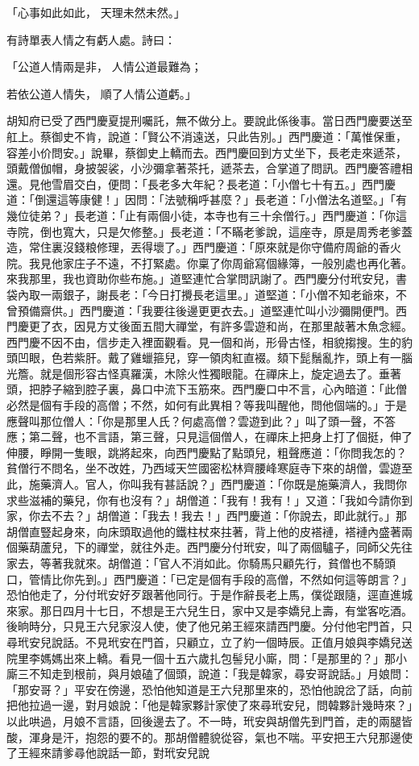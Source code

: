 「心事如此如此，  天理未然未然。」

有詩單表人情之有虧人處。詩曰：

「公道人情兩是非，  人情公道最難為；

若依公道人情失，  順了人情公道虧。」

胡知府已受了西門慶夏提刑囑託，無不做分上。要說此係後事。當日西門慶要送至舡上。蔡御史不肯，說道：「賢公不消遠送，只此告別。」西門慶道：「萬惟保重，容差小价問安。」說畢，蔡御史上轎而去。西門慶回到方丈坐下，長老走來遞茶，頭戴僧伽帽，身披袈裟，小沙彌拿著茶托，遞茶去，合掌道了問訊。西門慶答禮相還。見他雪眉交白，便問：「長老多大年紀？長老道：「小僧七十有五。」西門慶道：「倒還這等康健！」因問：「法號稱呼甚麼？」長老道：「小僧法名道堅。」「有幾位徒弟？」長老道：「止有兩個小徒，本寺也有三十余僧行。」西門慶道：「你這寺院，倒也寬大，只是欠修整。」長老道：「不瞞老爹說，這座寺，原是周秀老爹蓋造，常住裏沒錢粮修理，丟得壞了。」西門慶道：「原來就是你守備府周爺的香火院。我見他家庄子不遠，不打緊處。你稟了你周爺寫個緣簿，一般別處也再化著。來我那里，我也資助你些布施。」道堅連忙合掌問訊謝了。西門慶分付玳安兒，書袋內取一兩銀子，謝長老：「今日打攪長老這里。」道堅道：「小僧不知老爺來，不曾預備齋供。」西門慶道：「我要往後邊更更衣去。」道堅連忙叫小沙彌開便門。西門慶更了衣，因見方丈後面五間大禪堂，有許多雲遊和尚，在那里敲著木魚念經。西門慶不因不由，信步走入裡面觀看。見一個和尚，形骨古怪，相貌搊搜。生的豹頭凹眼，色若紫肝。戴了雞蠟箍兒，穿一領肉紅直裰。頦下髭鬚亂拃，頭上有一腦光簷。就是個形容古怪真羅漢，木除火性獨眼龍。在禪床上，旋定過去了。垂著頭，把脖子縮到腔子裏，鼻口中流下玉筋來。西門慶口中不言，心內暗道：「此僧必然是個有手段的高僧；不然，如何有此異相？等我叫醒他，問他個端的。」于是應聲叫那位僧人：「你是那里人氏？何處高僧？雲遊到此？」叫了頭一聲，不答應；第二聲，也不言語，第三聲，只見這個僧人，在禪床上把身上打了個挺，伸了伸腰，睜開一隻眼，跳將起來，向西門慶點了點頭兒，粗聲應道：「你問我怎的？貧僧行不問名，坐不改姓，乃西域天竺國密松林齊腰峰寒庭寺下來的胡僧，雲遊至此，施藥濟人。官人，你叫我有甚話說？」西門慶道：「你既是施藥濟人，我問你求些滋補的藥兒，你有也沒有？」胡僧道：「我有！我有！」又道：「我如今請你到家，你去不去？」胡僧道：「我去！我去！」西門慶道：「你說去，即此就行。」那胡僧直豎起身來，向床頭取過他的鐵柱杖來拄著，背上他的皮褡褳，褡褳內盛著兩個藥葫蘆兒，下的禪堂，就往外走。西門慶分付玳安，叫了兩個驢子，同師父先往家去，等著我就來。胡僧道：「官人不消如此。你騎馬只顧先行，貧僧也不騎頭口，管情比你先到。」西門慶道：「已定是個有手段的高僧，不然如何這等朗言？」恐怕他走了，分付玳安好歹跟著他同行。于是作辭長老上馬，僕從跟隨，逕直進城來家。那日四月十七日，不想是王六兒生日，家中又是李嬌兒上壽，有堂客吃酒。後晌時分，只見王六兒家沒人使，使了他兄弟王經來請西門慶。分付他宅門首，只尋玳安兒說話。不見玳安在門首，只顧立，立了約一個時辰。正值月娘與李嬌兒送院里李媽媽出來上轎。看見一個十五六歲扎包髻兒小廝，問：「是那里的？」那小廝三不知走到根前，與月娘磕了個頭，說道：「我是韓家，尋安哥說話。」月娘問：「那安哥？」平安在傍邊，恐怕他知道是王六兒那里來的，恐怕他說岔了話，向前把他拉過一邊，對月娘說：「他是韓家夥計家使了來尋玳安兒，問韓夥計幾時來？」以此哄過，月娘不言語，回後邊去了。不一時，玳安與胡僧先到門首，走的兩腿皆酸，渾身是汗，抱怨的要不的。那胡僧體貌從容，氣也不喘。平安把王六兒那邊使了王經來請爹尋他說話一節，對玳安兒說